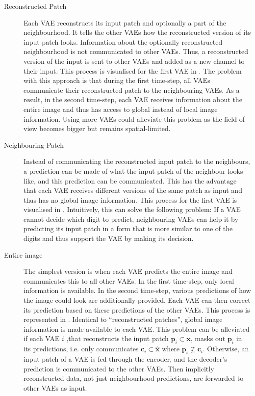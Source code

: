 \begin{description}
	\item [Reconstructed Patch] Each VAE reconstructs its input patch and optionally a part of the neighbourhood. It tells the other VAEs how the reconstructed version of its input patch looks. Information about the optionally reconstructed neighbourhood is not communicated to other VAEs. Thus, a reconstructed version of the input is sent to other VAEs and added as a new channel to their input. This process is visualised for the first VAE in . The problem with this approach is that during the first time-step, all VAEs communicate their reconstructed patch to the neighbouring VAEs. As a result, in the second time-step, each VAE receives information about the entire image and thus has access to global instead of local image information. Using more VAEs could alleviate this problem as the field of view becomes bigger but remains spatial-limited.
	\item [Neighbouring Patch] Instead of communicating the reconstructed input patch to the neighbours, a prediction can be made of what the input patch of the neighbour looks like, and this prediction can be communicated. This has the advantage that each VAE receives different versions of the same patch as input and thus has no global image information. This process for the first VAE is visualised in . Intuitively, this can solve the following problem: If a VAE cannot decide which digit to predict, neighbouring VAEs can help it by predicting its input patch in a form that is more similar to one of the digits and thus support the VAE by making its decision. 
	\item[Entire image] The simplest version is when each VAE predicts the entire image and communicates this to all other VAEs. In the first time-step, only local information is available. In the second time-step, various predictions of how the image could look are additionally provided. Each VAE can then correct its prediction based on these predictions of the other VAEs. This process is represented in . Identical to ``reconstructed patches'', global image information is made available to each VAE. This problem can be alleviated if each VAE $i$ ,that reconstructs the input patch $\boldsymbol{p}_i \subset
 \boldsymbol{x}$, masks out $\boldsymbol{p}_i$ in its predictions, i.e. only communicates $\boldsymbol{c}_i \subset \boldsymbol{\hat{x}}$ where $\boldsymbol{p}_i \nsubseteq \boldsymbol{c}_i$. Otherwise, an input patch of a VAE is fed through the encoder, and the decoder's prediction is communicated to the other VAEs. Then implicitly reconstructed data, not just neighbourhood predictions, are forwarded to other VAEs as input. 
\end{description}












